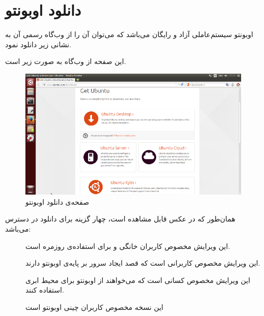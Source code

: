 \chapter{دانلود اوبونتو}
اوبونتو سیستم‌عاملی آزاد و رایگان می‌باشد که می‌توان آن را از وب‌گاه رسمی آن به نشانی زیر دانلود نمود.

\begin{url-address}

\end{url-address}
 این صفحه از وب‌گاه به صورت زیر است.
\begin{figure}[hbtp]
\centering
\includegraphics[scale=0.5]{pics/ubuntu-download.png}
\caption{صفحه‌ی دانلود اوبونتو}
\label{fig:ubuntu-download}
\end{figure}

همان‌طور که در عکس قابل مشاهده است، چهار گزینه برای دانلود در دسترس می‌باشد:
\begin{description}
\item[] این ویرایش مخصوص کاربران خانگی و برای استفاده‌ی روزمره است.
\item[] این ویرایش مخصوص کاربرانی است که قصد ایجاد سرور بر پایه‌ی اوبونتو دارند.
\item[] این ویرایش مخصوص کسانی است که می‌خواهند از اوبونتو برای محیط ابری استفاده کنند.
\item[] این نسخه مخصوص کاربران چینی اوبونتو است
\end{description}